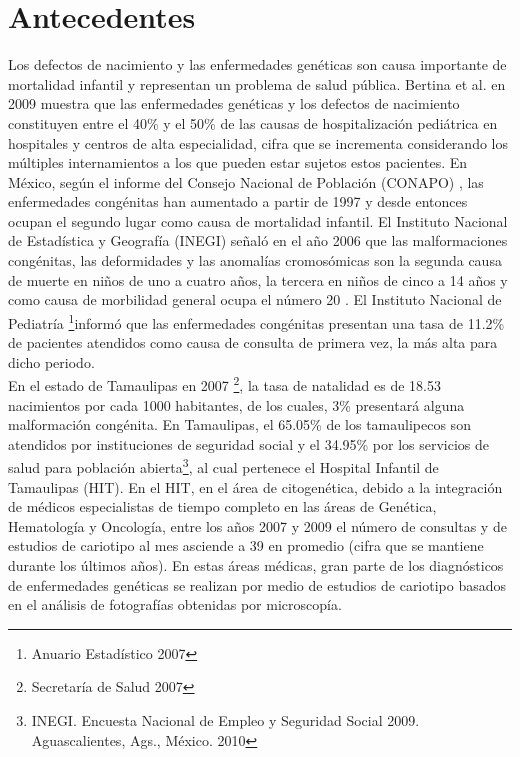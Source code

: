 \documentclass[12pt,letterpaper,titlepage]{article}
\begin{document}
\section{Antecedentes}\label{antecedentes}
Los defectos de nacimiento y las enfermedades genéticas son causa importante de mortalidad infantil y representan un problema de salud pública. Bertina et al. en 2009 \cite{102} muestra que las enfermedades genéticas y los defectos de nacimiento constituyen entre el 40\% y el 50\% de las causas de hospitalización pediátrica en hospitales y centros de alta especialidad, cifra que se incrementa considerando los múltiples internamientos a los que pueden estar sujetos estos pacientes. En México, según el informe del Consejo Nacional de Población (CONAPO) \cite{101}, las enfermedades congénitas han aumentado a partir de 1997 y desde entonces ocupan el segundo lugar como causa de mortalidad infantil. El Instituto Nacional de Estadística y Geografía (INEGI) señaló en el año 2006 que las malformaciones congénitas, las deformidades y las anomalías cromosómicas son la segunda causa de muerte en niños de uno a cuatro años, la tercera en niños de cinco a 14 años y como causa de morbilidad general ocupa el número 20 \cite{102}. El Instituto Nacional de Pediatría \footnote{Anuario Estadístico 2007}informó que las enfermedades congénitas presentan una tasa de 11.2\% de pacientes atendidos como causa de consulta de primera vez, la más alta para dicho periodo. \\

En el estado de Tamaulipas en 2007 \footnote{Secretaría de Salud 2007}, la tasa de natalidad es de 18.53 nacimientos por cada 1000 habitantes, de los cuales, 3\% presentará alguna malformación congénita. En Tamaulipas, el 65.05\% de los tamaulipecos son atendidos por instituciones de seguridad social y el 34.95\% por los servicios de salud para población abierta\footnote{INEGI. Encuesta Nacional de Empleo y Seguridad Social 2009. Aguascalientes, Ags., México. 2010}, al cual pertenece el Hospital Infantil de Tamaulipas (HIT). En el HIT, en el área de citogenética, debido a la integración de médicos especialistas de tiempo completo en las áreas de Genética, Hematología y Oncología, entre los años 2007 y 2009 el número de consultas y de estudios de cariotipo al mes asciende a 39 en promedio (cifra que se mantiene durante los últimos años). En estas áreas médicas, gran parte de los diagnósticos de enfermedades genéticas se realizan por medio de estudios de cariotipo basados en el análisis de fotografías obtenidas por microscopía. \\
\end{document}
